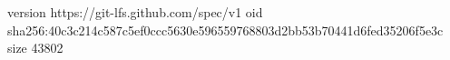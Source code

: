 version https://git-lfs.github.com/spec/v1
oid sha256:40c3c214c587c5ef0ccc5630e596559768803d2bb53b70441d6fed35206f5e3c
size 43802
